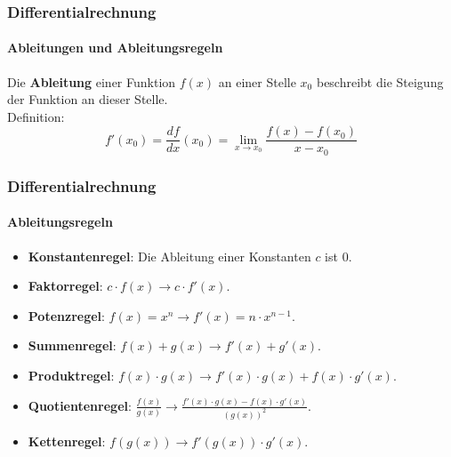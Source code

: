 \documentclass{beamer}
\begin{document}
\begin{frame}
  \frametitle{Differentialrechnung}
  \framesubtitle{Ableitungen und Ableitungsregeln}


Die \textbf{Ableitung} einer Funktion $f(x)$ an einer Stelle $x_0$ beschreibt die Steigung der Funktion an dieser Stelle.\\

Definition: $$f'(x_0)=\frac{df}{dx}(x_0)=\lim_{x \to x_0} \frac{f(x)-f(x_0)}{x - x_0}$$
\begin{center}
\end{center}   
\end{frame}

\begin{frame}
  \frametitle{Differentialrechnung}
  \framesubtitle{Ableitungsregeln}

  \begin{itemize}
    \item \textbf{Konstantenregel}: Die Ableitung einer Konstanten $c$ ist $0$.
    \item \textbf{Faktorregel}: $c\cdot f(x) \longrightarrow c \cdot f'(x)$.
    \item \textbf{Potenzregel}: $f(x) = x^n \longrightarrow f'(x) = n \cdot x^{n-1}$.
    \item \textbf{Summenregel}: $f(x) + g(x) \longrightarrow f'(x) + g'(x)$.
    \item \textbf{Produktregel}: $f(x) \cdot g(x) \longrightarrow f'(x) \cdot g(x) + f(x) \cdot g'(x)$.
    \item \textbf{Quotientenregel}:  $\frac{f(x)}{g(x)} \longrightarrow \frac{f'(x) \cdot g(x) - f(x) \cdot g'(x)}{(g(x))^2}$.
    \item \textbf{Kettenregel}:  $f(g(x)) \longrightarrow f'(g(x)) \cdot g'(x)$.
  \end{itemize}
\end{frame}
\end{document}
